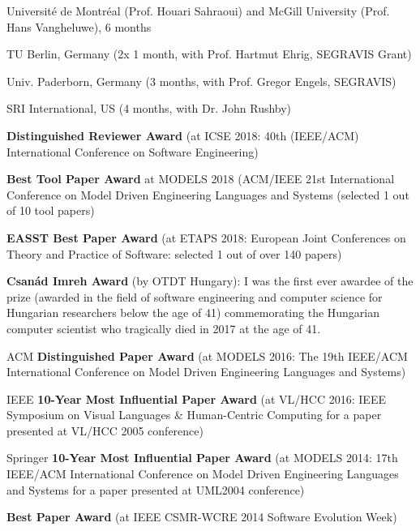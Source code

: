 \documentclass{xetexCV}
\begin{document}
Universit\'e de Montr\'eal  (Prof. Houari Sahraoui) and McGill University (Prof. Hans Vangheluwe),  6 months


TU Berlin, Germany (2x 1 month, with Prof. Hartmut Ehrig, SEGRAVIS Grant)

Univ. Paderborn, Germany  (3 months, with Prof. Gregor Engels,
SEGRAVIS) \

SRI International, US (4 months, with Dr. John Rushby)  


\textbf{Distinguished Reviewer Award}  (at ICSE 2018: 40th (IEEE/ACM) International Conference on Software Engineering)

\textbf{Best Tool Paper Award}  at MODELS 2018 (ACM/IEEE 21st International Conference on Model Driven Engineering Languages and Systems (selected 1 out of 10 tool papers)

\textbf{EASST Best Paper Award}  (at ETAPS 2018: European Joint Conferences on Theory and Practice of Software: selected 1 out of over 140 papers)

\textbf{Csanád Imreh Award}  (by OTDT Hungary): I was the first ever awardee of the prize (awarded in the field of software engineering and computer science for Hungarian researchers below the age of 41) commemorating the Hungarian computer scientist who tragically died in 2017 at the age of 41.  

ACM  \textbf{Distinguished Paper Award} (at MODELS 2016: The 19th IEEE/ACM International Conference on Model Driven Engineering Languages and Systems) 

IEEE  \textbf{10-Year Most Influential Paper Award} \newline (at VL/HCC 2016: IEEE Symposium on Visual Languages \& Human-Centric Computing for a paper presented at VL/HCC 2005 conference) 

Springer  \textbf{10-Year Most Influential Paper Award} \newline (at MODELS 2014: 17th IEEE/ACM International Conference on Model Driven Engineering Languages and Systems for a paper presented at UML2004 conference) 

\textbf{Best Paper Award}  (at IEEE CSMR-WCRE 2014 Software Evolution Week) 
\end{document}

